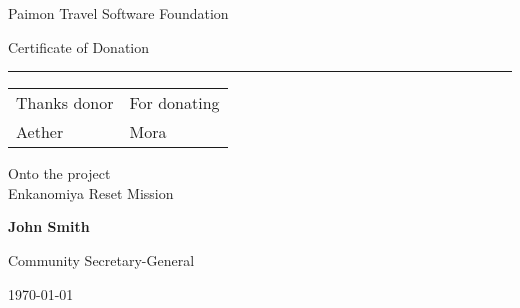 \documentclass[a4paper,12pt]{article}
\title{}
\author{}
\date{\today}
\newcommand{\donorData}[1]{
    {\large\upshape#1}
}
\begin{document}
\center

{Paimon Travel Software Foundation}
\vskip 24pt

{\huge\fontsize{33pt}{33pt}\selectfont{} Certificate of Donation}
\vskip 24pt

\rule{60mm}{0.4pt}

\vfill




\itshape
\begin{tabu}{X[c]X[c]}
	{Thanks donor}             & {For donating}         \\
	{\donorData{Aether}} & {\donorData{100 Mora}} \\
\end{tabu}
\vskip 12pt

Onto the project\\
\donorData{Enkanomiya Reset Mission}
\upshape




\vfill
\flushright

{\large\bfseries John Smith}

{\small Community Secretary-General}

{\small\today}
\end{document}

